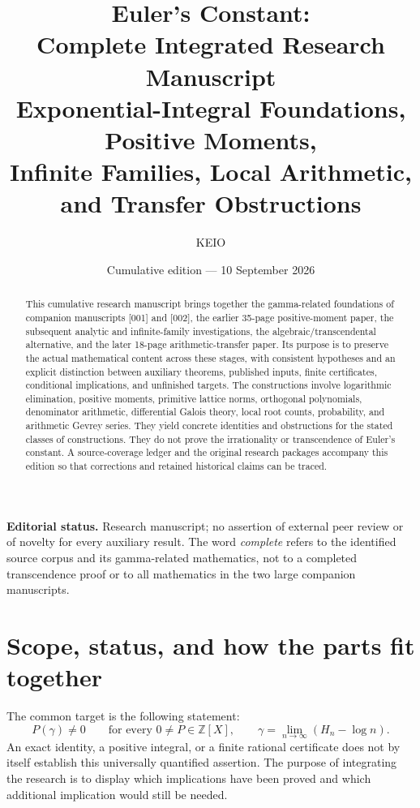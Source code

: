 \documentclass[11pt,a4paper]{article}
\title{\bfseries Euler's Constant:\\[4pt]
Complete Integrated Research Manuscript\\[9pt]
\large Exponential-Integral Foundations, Positive Moments,\\
Infinite Families, Local Arithmetic, and Transfer Obstructions}
\author{KEIO}
\date{Cumulative edition --- 10 September 2026}
\newcommand{\Z}{\mathbb Z}
\theoremstyle{definition}
\theoremstyle{remark}
\numberwithin{equation}{section}
\begin{document}
\maketitle
\begin{abstract}
This cumulative research manuscript brings together the gamma-related
foundations of companion manuscripts [001] and [002], the earlier
35-page positive-moment paper, the subsequent analytic and infinite-family
investigations, the algebraic/transcendental alternative, and the later
18-page arithmetic-transfer paper. Its purpose is to preserve the actual
mathematical content across these stages, with consistent hypotheses and
an explicit distinction between auxiliary theorems, published inputs,
finite certificates, conditional implications, and unfinished targets.
The constructions involve logarithmic elimination, positive moments,
primitive lattice norms, orthogonal polynomials, denominator arithmetic,
differential Galois theory, local root counts, probability, and arithmetic
Gevrey series. They yield concrete identities and obstructions for the
stated classes of constructions. They do not prove the irrationality or
transcendence of Euler's constant. A source-coverage ledger and the original
research packages accompany this edition so that corrections and retained
historical claims can be traced.
\end{abstract}
\noindent\textbf{Editorial status.} Research manuscript; no assertion of
external peer review or of novelty for every auxiliary result. The word
\emph{complete} refers to the identified source corpus and its gamma-related
mathematics, not to a completed transcendence proof or to all mathematics in
the two large companion manuscripts.
\clearpage
\tableofcontents
\clearpage

\section{Scope, status, and how the parts fit together}
\label{master:scope}

The common target is the following statement:
\begin{equation}\label{master:target}
 P(\gamma)\ne0\qquad
 \text{for every }0\ne P\in\Z[X],
 \qquad
 \gamma=\lim_{n\to\infty}(H_n-\log n).
\end{equation}
An exact identity, a positive integral, or a finite rational certificate
does not by itself establish this universally quantified assertion. The
purpose of integrating the research is to display which implications have
been proved and which additional implication would still be needed.
\end{document}
